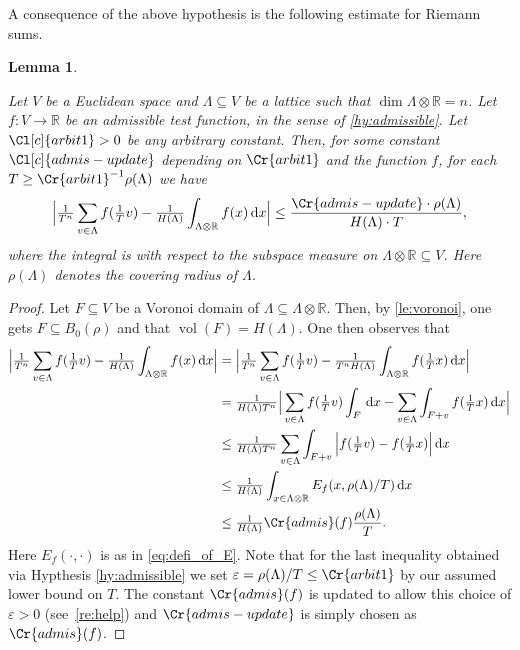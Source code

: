 \documentclass{amsart}
\newtheorem{lemma}[theorem]{Lemma}
\theoremstyle{definition}
\theoremstyle{remark}
\newcommand{\diff}{\,\mathrm{d}}
\DeclareMathOperator{\vol}{vol}
\begin{document}
A consequence of the above hypothesis is the following estimate for Riemann sums. 
\begin{lemma}
    \label{le:Riemann_estimate}

    Let $V$ be a Euclidean space and $\Lambda \subseteq V$ be a lattice such that $\dim \Lambda \otimes \mathbb{R} = n$.
    Let $f:V \rightarrow  \mathbb{R}$ be an admissible test function, in the sense of \cref{hy:admissible}.
    Let $\Cl[c]{arbit1} > 0$ be any arbitrary constant.
    Then, for some constant $\Cl[c]{admis-update}$ depending on $\Cr{arbit1}$ and the function $f$, for each
    $T \geq  \Cr{arbit1}^{-1} \rho(\Lambda)$ we have
    \begin{equation}
        \Big|\tfrac{1}{T^{n}}\sum_{v \in \Lambda} f(\tfrac{1}{T}v) - \tfrac{1}{H(\Lambda)} \int_{\Lambda \otimes \mathbb{R}}^{} f(x) \diff  x  \Big| \leq \frac{\Cr{admis-update} \cdot \rho(\Lambda)}{H(\Lambda)\cdot T},
    \end{equation}
    where the integral is with respect to the subspace measure on $\Lambda \otimes \mathbb{R} \subseteq V$. 
    Here 
    $\rho(\Lambda)$ denotes the covering radius of $\Lambda$.
\end{lemma}
\begin{proof}
    Let $F \subseteq V$ be a Voronoi domain of $\Lambda \subseteq \Lambda \otimes \mathbb{R}$.
    Then, by \cref{le:voronoi}, one gets $F \subseteq B_{0} (\rho)$ and that $\vol(F) = H(\Lambda)$.
    One then observes that
    {\small
        \begin{align}
            \Big|\tfrac{1}{T^{n}}\sum_{v \in \Lambda} f(\tfrac{1}{T}v) - \tfrac{1}{H(\Lambda)} \int_{\Lambda \otimes \mathbb{R}}^{} f(x) \diff  x  \Big|  
    &
    =  
    \Big|\tfrac{1}{T^{n}}\sum_{v \in \Lambda} f(\tfrac{1}{T}v) - \tfrac{1}{ T ^{n}H(\Lambda)  } 
    \int_{\Lambda \otimes \mathbb{R}}^{} f( \tfrac{1}{T} x) \diff  x  \Big|  
    \\ 
    &
    =  
    \tfrac{1}{H(\Lambda)T^{n}} \Big| \sum_{v \in \Lambda} f(\tfrac{1}{T}v) \int_{ F}^{} \diff x -    
    \sum_{v \in \Lambda}\int_{ F+v}^{}  f( \tfrac{1}{T} x) \diff  x  \Big|  
    \\ 
    &
    \leq  
    \tfrac{1}{H(\Lambda)T^{n}} \sum_{v \in \Lambda}\int_{ F+v}^{} \Big| f(\tfrac{1}{T}v) -    
    f( \tfrac{1}{T} x)   \Big| \diff x 
    \\ 
    & 
    \leq  
    \tfrac{1}{H(\Lambda)} \int_{x \in \Lambda \otimes \mathbb{R}}  E_f(x,\rho(\Lambda)/T) \diff x 
 \\ & \leq  
 \tfrac{1}{H(\Lambda)} \Cr{admis}(f) \frac{\rho(\Lambda)}{T}.
    \end{align}}
    Here $E_{f}(\cdot,\cdot)$ is as in \cref{eq:defi_of_E}. Note that for the last inequality obtained via Hypthesis \ref{hy:admissible} we set $\varepsilon = \rho(\Lambda)/T \leq \Cr{arbit1}$ by our assumed lower bound on $T$. 
    The constant $\Cr{admis}(f)$ is updated to allow this choice of $\varepsilon >0$ (see~\cref{re:help})
    and $\Cr{admis-update}$ is simply chosen as $\Cr{admis}(f)$.
\end{proof}
\end{document}
